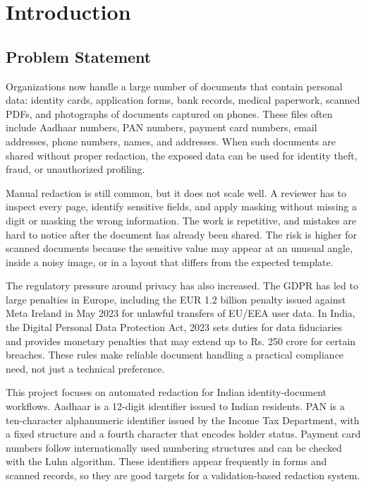 \chapter{Introduction}
\section{Problem Statement}

Organizations now handle a large number of documents that contain personal data: identity cards, application forms, bank records, medical paperwork, scanned PDFs, and photographs of documents captured on phones. These files often include Aadhaar numbers, PAN numbers, payment card numbers, email addresses, phone numbers, names, and addresses. When such documents are shared without proper redaction, the exposed data can be used for identity theft, fraud, or unauthorized profiling.

Manual redaction is still common, but it does not scale well. A reviewer has to inspect every page, identify sensitive fields, and apply masking without missing a digit or masking the wrong information. The work is repetitive, and mistakes are hard to notice after the document has already been shared. The risk is higher for scanned documents because the sensitive value may appear at an unusual angle, inside a noisy image, or in a layout that differs from the expected template.

The regulatory pressure around privacy has also increased. The GDPR has led to large penalties in Europe, including the EUR 1.2 billion penalty issued against Meta Ireland in May 2023 for unlawful transfers of EU/EEA user data. In India, the Digital Personal Data Protection Act, 2023 sets duties for data fiduciaries and provides monetary penalties that may extend up to Rs. 250 crore for certain breaches. These rules make reliable document handling a practical compliance need, not just a technical preference.

This project focuses on automated redaction for Indian identity-document workflows. Aadhaar is a 12-digit identifier issued to Indian residents. PAN is a ten-character alphanumeric identifier issued by the Income Tax Department, with a fixed structure and a fourth character that encodes holder status. Payment card numbers follow internationally used numbering structures and can be checked with the Luhn algorithm. These identifiers appear frequently in forms and scanned records, so they are good targets for a validation-based redaction system.

